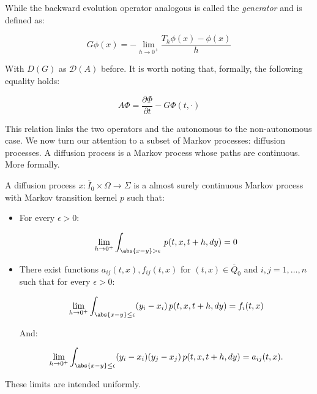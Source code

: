 While the backward evolution operator analogous is called the \textit{generator} and is defined as:

\begin{equation}
    G\phi(x) = - \lim_{h\to0^+} \frac{T_h\phi(x) - \phi(x)}{h}
\end{equation}

With $D(G)$ as $\mathcal{D}(A)$ before. It is worth noting that, formally, the following equality holds:

\begin{equation}
    A\Phi = \frac{\partial \Phi}{\partial t} - G\Phi(t,\cdot)
\end{equation}

This relation links the two operators and the autonomous to the non-autonomous case. We now turn our attention to 
a subset of Markov processes: diffusion processes. A diffusion process is a Markov process whose paths are continuous. 
More formally. 

\begin{definition}
    A diffusion process $x:\overline{I}_0\times\Omega\rightarrow\Sigma$ is a almost surely continuous Markov process with Markov transition kernel $p$ such that:

    \begin{itemize}
        \item For every $\epsilon>0$:
        
        \begin{equation}
            \lim_{h\to0^+} \int_{\abs{x-y}>\epsilon} \,p(t,x,t+h,dy) = 0
        \end{equation}

        \item There exist functions $a_{ij}(t,x),f_{ij}(t,x)$ for $(t,x)\in\overline{Q}_0$ and $i,j=1,\dots,n$ such that for every $\epsilon>0$:
        
        \begin{equation}
            \lim_{h\to0^+} \int_{\abs{x-y}\leq\epsilon} (y_i-x_i)\,p(t,x,t+h,dy) = f_i(t,x)
        \end{equation}

        And:

        \begin{equation}
            \lim_{h\to0^+} \int_{\abs{x-y}\leq\epsilon} (y_i-x_i)(y_j-x_j)\,p(t,x,t+h,dy) = a_{ij}(t,x).
        \end{equation}
    \end{itemize}

    These limits are intended uniformly.
\end{definition}

